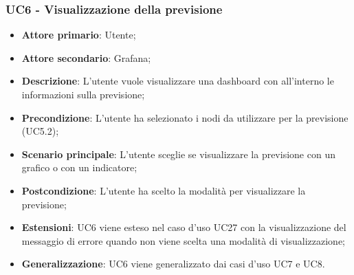 \subsubsection{UC6 - Visualizzazione della previsione}
\label{sssec:uc6}
\begin{itemize}
  \item \textbf{Attore primario}: Utente;
  \item \textbf{Attore secondario}: Grafana;
  \item \textbf{Descrizione}: L'utente vuole visualizzare una dashboard con all'interno le informazioni sulla previsione;
  \item \textbf{Precondizione}: L'utente ha selezionato i nodi da utilizzare per la previsione (UC5.2);
  \item \textbf{Scenario principale}: L'utente sceglie se visualizzare la previsione con un grafico o con un indicatore;
  \item \textbf{Postcondizione}: L'utente ha scelto la modalità per visualizzare la previsione;
  \item \textbf{Estensioni}: UC6 viene esteso nel caso d'uso UC27 con la visualizzazione del messaggio di errore quando non viene scelta una modalità di visualizzazione;
  \item \textbf{Generalizzazione}: UC6 viene generalizzato dai casi d'uso UC7 e UC8.
\end{itemize}
